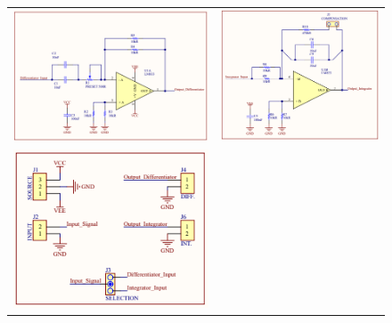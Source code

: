 \begin{figure}[H]
	\centering
	\begin{tabular}{c c}
		\includegraphics[scale=0.62]{../EJ4/Recursos/Altium/Derivador_esquematico.png} &
		\includegraphics[scale=0.65]{../EJ4/Recursos/Altium/Integrador_esquematico.png} \\
		\includegraphics[scale=0.7]{../EJ4/Recursos/Altium/Entradas_salidas_esquematico.png} &

\end{tabular}
\end{figure}
